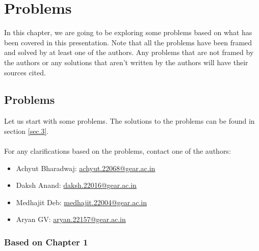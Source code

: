 \documentclass[a4paper]{report}
\begin{document}
\chapter{Problems}
In this chapter, we are going to be exploring some problems based on what has been covered in this presentation.
Note that all the problems have been framed and solved by at least one of the authors. Any problems that are not
framed by the authors or any solutions that aren't written by the authors will have their sources cited.

\section{Problems} \label{sec.4}
Let us start with some problems. The solutions to the problems can be found in section \ref{sec.3}.\\\\
For any clarifications based on the problems, contact one of the authors: 
\begin{itemize}
  \item Achyut Bharadwaj: \href{mailto:achyut.22068@gear.ac.in}{achyut.22068@gear.ac.in}
  \item Daksh Anand: \href{mailto:daksh.22016@gear.ac.in}{daksh.22016@gear.ac.in}
  \item Medhajit Deb: \href{mailto:medhajit.22004@gear.ac.in}{medhajit.22004@gear.ac.in}
  \item Aryan GV: \href{mailto:aryan.22157@gear.ac.in}{aryan.22157@gear.ac.in}
\end{itemize}

\subsection{Based on Chapter 1}
  \begin{tcolorbox}
  \end{tcolorbox}
  \begin{tcolorbox}
  \end{tcolorbox}
  \begin{tcolorbox}
  \end{tcolorbox}
\end{document}
